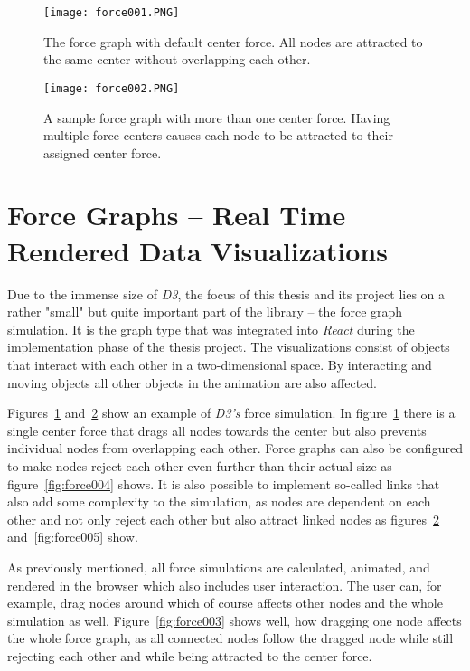 
\begin{figure}
  \centering
  \texttt{[image: force001.PNG]}
  \caption{The force graph with default center force. All nodes are attracted to the same center without overlapping each other.}
  \label{fig:force001}
\end{figure}

\begin{figure}
  \centering
  \texttt{[image: force002.PNG]}
  \caption{A sample force graph with more than one center force. Having multiple force centers causes each node to be attracted to their assigned center force.}
  \label{fig:force002}
\end{figure}

\section{Force Graphs -- Real Time Rendered Data Visualizations}

Due to the immense size of \emph{D3}, the focus of this thesis and its project lies on a rather "small" but quite important part of the library -- the force graph simulation. It is the graph type that was integrated into \emph{React} during the implementation phase of the thesis project. The visualizations consist of objects that interact with each other in a two-dimensional space. By interacting and moving objects all other objects in the animation are also affected. 

Figures~\ref{fig:force001} and~\ref{fig:force002} show an example of \emph{D3's} force simulation. In figure~\ref{fig:force001} there is a single center force that drags all nodes towards the center but also prevents individual nodes from overlapping each other. Force graphs can also be configured to make nodes reject each other even further than their actual size as figure~\ref{fig:force004} shows. It is also possible to implement so-called links that also add some complexity to the simulation, as nodes are dependent on each other and not only reject each other but also attract linked nodes as figures~\ref{fig:force002} and~\ref{fig:force005} show.

As previously mentioned, all force simulations are calculated, animated, and rendered in the browser which also includes user interaction. The user can, for example, drag nodes around which of course affects other nodes and the whole simulation as well. Figure~\ref{fig:force003} shows well, how dragging one node affects the whole force graph, as all connected nodes follow the dragged node while still rejecting each other and while being attracted to the center force.


